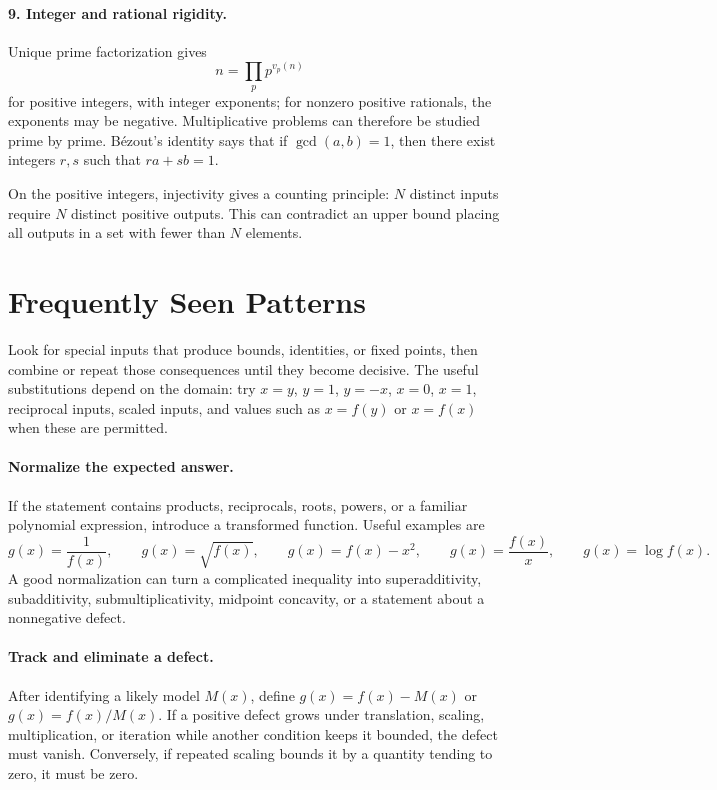 \documentclass[12pt,a4paper]{article}
\begin{document}
\paragraph{9. Integer and rational rigidity.}
Unique prime factorization gives
\[
n=\prod_p p^{v_p(n)}
\]
for positive integers, with integer exponents; for nonzero positive rationals,
the exponents may be negative. Multiplicative problems can therefore be
studied prime by prime. Bézout's identity says that if $\gcd(a,b)=1$, then
there exist integers $r,s$ such that $ra+sb=1$.

On the positive integers, injectivity gives a counting principle: $N$
distinct inputs require $N$ distinct positive outputs. This can contradict an
upper bound placing all outputs in a set with fewer than $N$ elements.

\section*{Frequently Seen Patterns}

Look for special inputs that produce bounds, identities, or fixed points, then
combine or repeat those consequences until they become decisive. The useful
substitutions depend on the domain: try $x=y$, $y=1$, $y=-x$, $x=0$, $x=1$,
reciprocal inputs, scaled inputs, and values such as $x=f(y)$ or $x=f(x)$
when these are permitted.

\paragraph{Normalize the expected answer.}
If the statement contains products, reciprocals, roots, powers, or a familiar
polynomial expression, introduce a transformed function. Useful examples are
\[
g(x)=\frac1{f(x)},\qquad g(x)=\sqrt{f(x)},\qquad
g(x)=f(x)-x^2,\qquad g(x)=\frac{f(x)}x,\qquad g(x)=\log f(x).
\]
A good normalization can turn a complicated inequality into superadditivity,
subadditivity, submultiplicativity, midpoint concavity, or a statement about
a nonnegative defect.

\paragraph{Track and eliminate a defect.}
After identifying a likely model $M(x)$, define $g(x)=f(x)-M(x)$ or
$g(x)=f(x)/M(x)$. If a positive defect grows under translation, scaling,
multiplication, or iteration while another condition keeps it bounded, the
defect must vanish. Conversely, if repeated scaling bounds it by a quantity
tending to zero, it must be zero.
\end{document}

